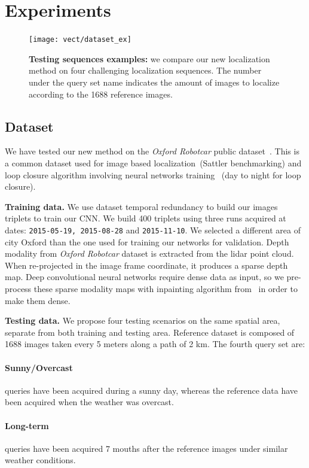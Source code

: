 \section{Experiments}
\label{sec:experiments}

\begin{figure}
	\center
	\texttt{[image: vect/dataset\_ex]}
	\caption{\label{fig:dataset} \textbf{Testing sequences examples:} we compare our new localization method on four challenging localization sequences. The number under the query set name indicates the amount of images to localize according to the 1688 reference images.}
\end{figure}

\subsection{Dataset}
\label{subsec:dataset}
	We have tested our new method on the \textit{Oxford Robotcar} public dataset~\cite{Maddern2016}. This is a common dataset used for image based localization~\cite{}(Sattler benchmarking) and loop closure algorithm involving neural networks training~\cite{} (day to night for loop closure).
		
\noindent\textbf{Training data.}
	We use dataset temporal redundancy to build our images triplets to train our CNN. We build 400 triplets using three runs acquired at dates: \texttt{2015-05-19, 2015-08-28} and \texttt{2015-11-10}. We selected a different area of city Oxford than the one used for training our networks for validation.
	Depth modality from \textit{Oxford Robotcar} dataset is extracted from the lidar point cloud. When re-projected in the image frame coordinate, it produces a sparse depth map. Deep convolutional neural networks require dense data as input, so we pre-process these sparse modality maps with inpainting algorithm from~\cite{Bevilacqua2017} in order to make them dense.

\noindent\textbf{Testing data.} We propose four testing scenarios on the same spatial area, separate from both training and testing area. Reference dataset is composed of 1688 images taken every 5 meters along a path of 2 km. The fourth query set are:
	\paragraph{Sunny/Overcast} queries have been acquired during a sunny day, whereas the reference data have been acquired when the weather was overcast.
	\paragraph{Long-term} queries have been acquired 7 mouths after the reference images under similar weather conditions.
